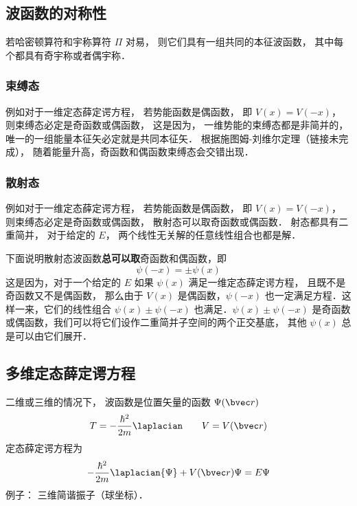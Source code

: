\subsection{波函数的对称性}
若哈密顿算符和宇称算符 $\Pi$ 对易， 则它们具有一组共同的本征波函数， 其中每个都具有奇宇称或者偶宇称．

\subsubsection{束缚态}
例如对于一维定态薛定谔方程， 若势能函数是偶函数， 即 $V(x) = V(-x)$， 则束缚态必定是奇函数或偶函数， 这是因为， 一维势能的束缚态都是非简并的， 唯一的一组能量本征矢必定就是共同本征矢． 根据施图姆-刘维尔定理（链接未完成）， 随着能量升高，奇函数和偶函数束缚态会交错出现．

\subsubsection{散射态}
例如对于一维定态薛定谔方程， 若势能函数是偶函数， 即 $V(x) = V(-x)$， 则束缚态必定是奇函数或偶函数， 散射态可以取奇函数或偶函数． 射态都具有二重简并， 对于给定的 $E$， 两个线性无关解的任意线性组合也都是解．

下面说明散射态波函数\textbf{总可以取}奇函数和偶函数，即
\begin{equation}\label{SchEq_eq3}
\psi(-x) = \pm \psi(x)
\end{equation}
这是因为，对于一个给定的 $E$ 如果 $\psi(x)$ 满足一维定态薛定谔方程， 且既不是奇函数又不是偶函数， 那么由于 $V(x)$ 是偶函数，$\psi(-x)$ 也一定满足方程．这样一来，它们的线性组合 $\psi(x)\pm\psi(-x)$ 也满足．$\psi(x)\pm \psi(-x)$ 是奇函数或偶函数，我们可以将它们设作二重简并子空间的两个正交基底， 其他 $\psi(x)$ 总是可以由它们展开．

\subsection{多维定态薛定谔方程}
二维或三维的情况下， 波函数是位置矢量的函数 $\Psi(\bvec r)$
\begin{equation}
T = -\frac{\hbar^2}{2m} \laplacian \qquad V = V(\bvec r)
\end{equation}
定态薛定谔方程为
\begin{equation}\label{SchEq_eq4}
-\frac{\hbar^2}{2m} \laplacian {\Psi} + V(\bvec r)\Psi = E \Psi
\end{equation}
例子： 三维简谐振子（球坐标）．
